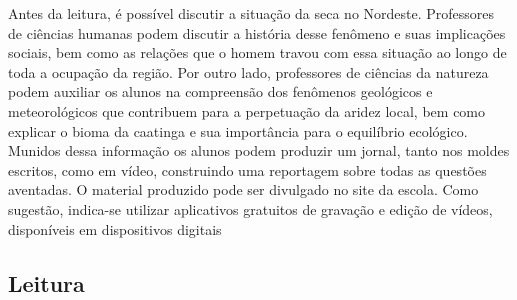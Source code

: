 \documentclass[12pt]{extarticle}
\begin{document}
Antes da leitura, é possível discutir a situação da seca no
Nordeste. Professores de ciências humanas podem discutir a história
desse fenômeno e suas implicações sociais, bem como as relações que o
homem travou com essa situação ao longo de toda a ocupação da região.
Por outro lado, professores de ciências da natureza podem auxiliar os
alunos na compreensão dos fenômenos geológicos e meteorológicos que
contribuem para a perpetuação da aridez local, bem como explicar o bioma
da caatinga e sua importância para o equilíbrio ecológico. Munidos dessa
informação os alunos podem produzir um jornal, tanto nos moldes
escritos, como em vídeo, construindo uma reportagem sobre todas as
questões aventadas. O material produzido pode ser divulgado no site da
escola. Como sugestão, indica-se utilizar aplicativos gratuitos de
gravação e edição de vídeos, disponíveis em dispositivos digitais

\subsection{Leitura}

\end{document}
